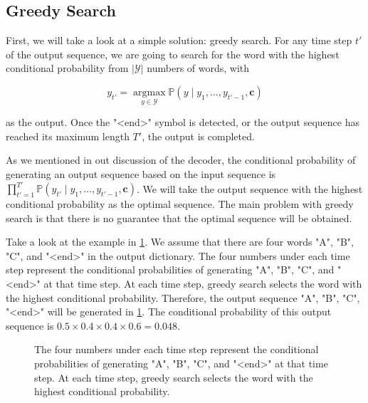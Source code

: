 \subsection{Greedy Search}\label{subsec:greedy-search}

First, we will take a look at a simple solution: greedy search. For any time step $t'$ of the output sequence, we are going to search for the word with the highest conditional probability from $|\mathcal{Y}|$ numbers of words, with

$$y_{t'} = \operatorname*{argmax}_{y \in \mathcal{Y}} \mathbb{P}(y \mid y_1, \ldots, y_{t'-1}, \boldsymbol{c})$$

as the output.  Once the "<end>" symbol is detected, or the output sequence has reached its maximum length $T'$, the output is completed.

As we mentioned in out discussion of the decoder, the conditional probability of generating an output sequence based on the input sequence is $\prod_{t'=1}^{T'} \mathbb{P}(y_{t'} \mid y_1, \ldots, y_{t'-1}, \boldsymbol{c})$. We will take the output sequence with the highest conditional probability as the optimal sequence. The main problem with greedy search is that there is no guarantee that the optimal sequence will be obtained.

Take a look at the example in \cref{fig:s2s_prob1}. We assume that there are four words "A", "B", "C", and "<end>" in the output dictionary.  The four numbers under each time step represent the conditional probabilities of generating "A", "B", "C", and "<end>" at that time step.  At each time step, greedy search selects the word with the highest conditional probability. Therefore, the output sequence "A", "B", "C", "<end>" will be generated in \cref{fig:s2s_prob1}. The conditional probability of this output sequence is $0.5\times0.4\times0.4\times0.6 = 0.048$.


\begin{figure}[hpt]
	\centering
	
	\caption{The four numbers under each time step represent the conditional probabilities of generating "A", "B", "C", and "<end>" at that time step. At each time step, greedy search selects the word with the highest conditional probability.}
	\label{fig:s2s_prob1}
\end{figure}


